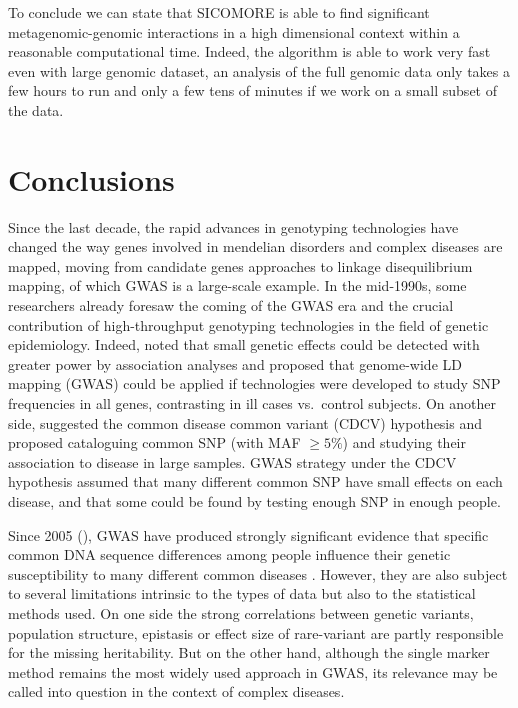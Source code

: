 \documentclass[]{book}
\begin{document}
To conclude we can state that SICOMORE is able to find significant
metagenomic-genomic interactions in a high dimensional context within a
reasonable computational time. Indeed, the algorithm is able to work
very fast even with large genomic dataset, an analysis of the full
genomic data only takes a few hours to run and only a few tens of
minutes if we work on a small subset of the data.

\hypertarget{conclusions}{%
\chapter*{Conclusions}\label{conclusions}}

Since the last decade, the rapid advances in genotyping technologies
have changed the way genes involved in mendelian disorders and complex
diseases are mapped, moving from candidate genes approaches to linkage
disequilibrium mapping, of which GWAS is a large-scale example. In the
mid-1990s, some researchers already foresaw the coming of the GWAS era
and the crucial contribution of high-throughput genotyping technologies
in the field of genetic epidemiology. Indeed, \citep{risch1996future} noted
that small genetic effects could be detected with greater power by
association analyses and proposed that genome-wide LD mapping (GWAS)
could be applied if technologies were developed to study SNP frequencies
in all genes, contrasting in ill cases vs.~control subjects. On another
side, \citep{lander1996new} suggested the common disease common variant
(CDCV) hypothesis and proposed cataloguing common SNP (with MAF
\(\geq 5\%\)) and studying their association to disease in large samples.
GWAS strategy under the CDCV hypothesis assumed that many different
common SNP have small effects on each disease, and that some could be
found by testing enough SNP in enough people.

Since 2005 (\citep{klein2005complement}), GWAS have produced strongly
significant evidence that specific common DNA sequence differences among
people influence their genetic susceptibility to many different common
diseases \citep{manolio2008hapmap}. However, they are also subject to several
limitations intrinsic to the types of data but also to the statistical
methods used. On one side the strong correlations between genetic
variants, population structure, epistasis or effect size of rare-variant
are partly responsible for the missing heritability. But on the other
hand, although the single marker method remains the most widely used
approach in GWAS, its relevance may be called into question in the
context of complex diseases.
\end{document}
